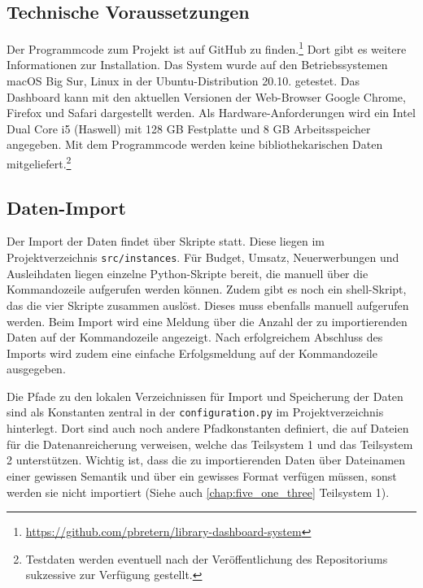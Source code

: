     \subsection{Technische Voraussetzungen}
    Der Programmcode zum Projekt ist auf GitHub zu finden.\footnote{ \url{https://github.com/pbretern/library-dashboard-system}} Dort gibt es weitere Informationen zur Installation.
    Das System wurde auf den Betriebssystemen macOS Big Sur, Linux in der Ubuntu-Distribution 20.10. getestet.
    Das Dashboard kann mit den aktuellen Versionen der Web-Browser Google Chrome, Firefox und Safari dargestellt werden. 
    Als Hardware-Anforderungen wird ein Intel Dual Core i5 (Haswell) mit 128 GB Festplatte und 8 GB Arbeitsspeicher angegeben. 
    Mit dem Programmcode werden keine bibliothekarischen Daten mitgeliefert.\footnote{ Testdaten werden eventuell nach der Veröffentlichung des Repositoriums
    sukzessive zur Verfügung gestellt.}
    
    \subsection{Daten-Import}
    Der Import der Daten findet über Skripte statt. Diese liegen im Projektverzeichnis \texttt{src/instances}.
    Für Budget, Umsatz, Neuerwerbungen und Ausleihdaten liegen einzelne Python-Skripte bereit, die manuell über die Kommandozeile
    aufgerufen werden können. Zudem gibt es noch ein shell-Skript, das die vier Skripte zusammen auslöst. Dieses
    muss ebenfalls manuell aufgerufen werden.
    Beim Import wird eine Meldung über die Anzahl der zu importierenden Daten auf der Kommandozeile angezeigt. 
    Nach erfolgreichem Abschluss des Imports wird zudem eine einfache Erfolgsmeldung auf der Kommandozeile ausgegeben.

    Die Pfade zu den lokalen Verzeichnissen für Import und Speicherung der Daten sind als Konstanten zentral in der \texttt{configuration.py}
    im Projektverzeichnis hinterlegt. Dort sind auch noch andere Pfadkonstanten definiert, die auf Dateien für die Datenanreicherung verweisen, welche das Teilsystem 1
    und das Teilsystem 2 unterstützen. Wichtig ist, dass die zu importierenden Daten über Dateinamen einer gewissen Semantik und 
    über ein gewisses Format verfügen müssen, sonst werden sie nicht importiert (Siehe auch \autoref{chap:five_one_three} Teilsystem 1).

